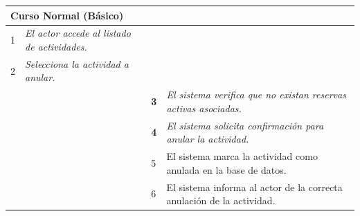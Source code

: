     \begin{table}[H]
        \begin{tabular}{llllllll}
        \hline
        \multicolumn{8}{|l|}{\cellcolor[HTML]{F2F2F2}Curso Normal (Básico)}                                                                                                                                                                                                                                                                          \\ \hline
        \multicolumn{1}{|c|}{1}  & \multicolumn{1}{l|}{{\color[HTML]{808080} \textit{El actor accede al listado de actividades.}}} & \multicolumn{1}{l|}{{\color[HTML]{808080} }}                    & \multicolumn{5}{l|}{{\color[HTML]{808080} }}                                                                                            \\ \hline
        \multicolumn{1}{|c|}{2}   & \multicolumn{1}{p{6cm}|}{{\color[HTML]{808080} \textit{Selecciona la actividad a anular.}}}                                                 & \multicolumn{1}{c|}{} & \multicolumn{5}{p{6cm}|}{{\color[HTML]{808080} \textit{}}}                         \\ \hline
        \multicolumn{1}{|l|}{}   & \multicolumn{1}{l|}{{\color[HTML]{808080} }}                                                          & \multicolumn{1}{l|}{{\color[HTML]{808080} \textbf{3}}}          & \multicolumn{5}{p{6cm}|}{{\color[HTML]{808080} \textit{El sistema verifica que no existan reservas activas asociadas.}}} \\ \hline
        \multicolumn{1}{|c|}{}  & \multicolumn{1}{p{6cm}|}{{\color[HTML]{808080} }} & \multicolumn{1}{l|}{{\color[HTML]{808080} \textbf{4}}}                    & \multicolumn{5}{p{6cm}|}{{\color[HTML]{808080} \textit{El sistema solicita confirmación para anular la actividad.}}}                                                                                            \\ \hline
        \multicolumn{1}{|l|}{}   & \multicolumn{1}{l|}{{\color[HTML]{808080} }}                                                          & \multicolumn{1}{l|}{{\color[HTML]{808080} 5}}                   & \multicolumn{5}{p{6cm}|}{{\color[HTML]{808080} El sistema marca la actividad como anulada en la base de datos.}}                                  \\ \hline
        \multicolumn{1}{|l|}{}   & \multicolumn{1}{l|}{{\color[HTML]{808080} }}                                                          & \multicolumn{1}{l|}{{\color[HTML]{808080} 6}}                   & \multicolumn{5}{p{6cm}|}{{\color[HTML]{808080} El sistema informa al actor de la correcta anulación de la actividad.}}                                  \\ \hline
        \end{tabular}
    \end{table}


